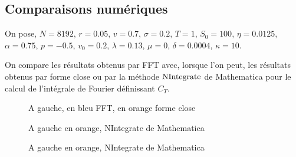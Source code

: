 \documentclass{article}
\begin{document}
\subsection{Comparaisons numériques}
On pose, $N = 8192$, $r = 0.05$, $v = 0.7$, $\sigma=0.2$, $T=1$, $S_0 = 100$, $\eta = 0.0125$, $\alpha = 0.75$, $p = -0.5$, $v_0 = 0.2$, $\lambda = 0.13$, $\mu = 0$, $\delta = 0.0004$, $\kappa = 10$.

On compare les résultats obtenus par FFT avec, lorsque l'on peut, les résultats obtenus par forme close ou par la méthode $\textup{NIntegrate}$ de Mathematica pour le calcul de l'intégrale de Fourier définissant $C_T$.

\begin{figure}[h]
	\centering
	\qquad
	\caption{A gauche, en bleu FFT, en orange forme close}
	\qquad
	\caption{A gauche en orange, NIntegrate de Mathematica}
	\qquad
	\caption{A gauche en orange, NIntegrate de Mathematica}
\end{figure}
\end{document}
